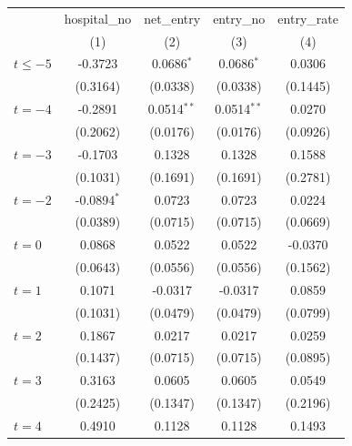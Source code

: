 \begingroup
\centering
\begin{tabular}{lcccc}
   \toprule
                          & hospital\_no  & net\_entry    & entry\_no     & entry\_rate \\    
                          & (1)           & (2)           & (3)           & (4)\\  
   \midrule 
   $t \leq -5$            & -0.3723       & 0.0686$^{*}$  & 0.0686$^{*}$  & 0.0306\\   
                          & (0.3164)      & (0.0338)      & (0.0338)      & (0.1445)\\   
   $t = -4$               & -0.2891       & 0.0514$^{**}$ & 0.0514$^{**}$ & 0.0270\\   
                          & (0.2062)      & (0.0176)      & (0.0176)      & (0.0926)\\   
   $t = -3$               & -0.1703       & 0.1328        & 0.1328        & 0.1588\\   
                          & (0.1031)      & (0.1691)      & (0.1691)      & (0.2781)\\   
   $t = -2$               & -0.0894$^{*}$ & 0.0723        & 0.0723        & 0.0224\\   
                          & (0.0389)      & (0.0715)      & (0.0715)      & (0.0669)\\   
   $t = 0$                & 0.0868        & 0.0522        & 0.0522        & -0.0370\\   
                          & (0.0643)      & (0.0556)      & (0.0556)      & (0.1562)\\   
   $t = 1$                & 0.1071        & -0.0317       & -0.0317       & 0.0859\\   
                          & (0.1031)      & (0.0479)      & (0.0479)      & (0.0799)\\   
   $t = 2$                & 0.1867        & 0.0217        & 0.0217        & 0.0259\\   
                          & (0.1437)      & (0.0715)      & (0.0715)      & (0.0895)\\   
   $t = 3$                & 0.3163        & 0.0605        & 0.0605        & 0.0549\\   
                          & (0.2425)      & (0.1347)      & (0.1347)      & (0.2196)\\   
   $t = 4$                & 0.4910        & 0.1128        & 0.1128        & 0.1493\\   

\end{tabular}
